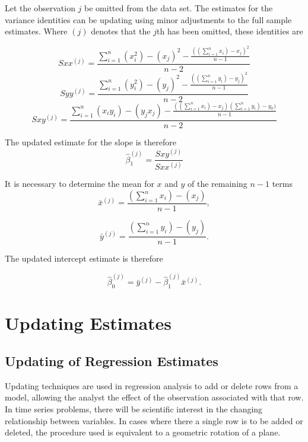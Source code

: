 \documentclass[MAIN.tex]{subfiles}
\begin{document}
Let the observation $j$ be omitted from the data set. The estimates for the variance identities can be updating using minor adjustments to the full sample estimates. Where $(j)$ denotes that the $j$th has been omitted, these identities are

\begin{equation}
Sxx^{(j)}=\frac{\sum_{i=1}^{n}(x_{i}^{2})-(x_{j})^{2}-\frac{((\sum_{i=1}^{n}x_{i})-x_{j})^{2}}{n-1}}{n-2}
\end{equation}
\begin{equation}
Syy^{(j)}=\frac{\sum_{i=1}^{n}(y_{i}^{2})-(y_{j})^{2}-\frac{((\sum_{i=1}^{n}y_{i})-y_{j})^{2}}{n-1}}{n-2}
\end{equation}
\begin{equation}
Sxy^{(j)}=\frac{\sum_{i=1}^{n}(x_{i}y_{i})-(y_{j}x_{j})-\frac{((\sum_{i=1}^{n}x_{i})-x_{j})(\sum_{i=1}^{n}y_{i})-y_{k})}{n-1}}{n-2}
\end{equation}

The updated estimate for the slope is therefore
\begin{equation}
\hat{\beta}_{1}^{(j)}=\frac{Sxy^{(j)}}{Sxx^{(j)}}
\end{equation}

It is necessary to determine the mean for $x$ and $y$ of the
remaining $n-1$ terms
\begin{equation}
\bar{x}^{(j)}=\frac{(\sum_{i=1}^{n}x_{i})-(x_{j})}{n-1},
\end{equation}

\begin{equation}
\bar{y}^{(j)}=\frac{(\sum_{i=1}^{n}y_{i})-(y_{j})}{n-1}.
\end{equation}

The updated intercept estimate is therefore

\begin{equation}
\hat{\beta}_{0}^{(j)}=\bar{y}^{(j)}-\hat{\beta}_{1}^{(j)}\bar{x}^{(j)}.
\end{equation}

\newpage


\section{Updating Estimates} %


\subsection{Updating of Regression Estimates}
Updating techniques are used in regression analysis to add or delete rows from a model, allowing the analyst the effect of the
observation associated with that row. In time series problems, there will be scientific interest in the changing relationship
between variables. In cases where there a single row is to be added or deleted, the procedure used is equivalent to a geometric
rotation of a plane.
\end{document}
